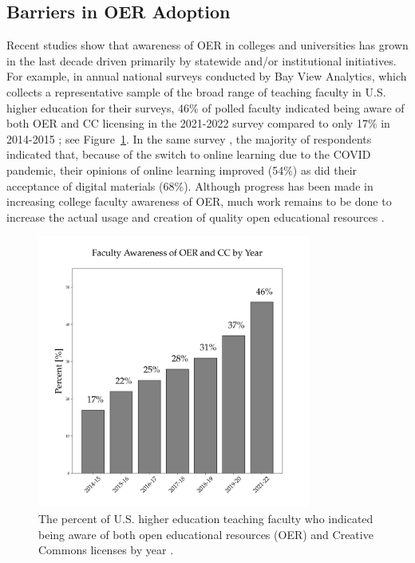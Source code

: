 \documentclass[11pt]{article}
\begin{document}
\subsection{Barriers in OER Adoption}
Recent studies show that awareness of OER in colleges and universities has grown in the last decade driven primarily by statewide and/or institutional initiatives.  For example, in annual national surveys conducted by Bay View Analytics, which collects a representative sample of the broad range of teaching faculty in U.S. higher education for their surveys, 46\% of polled faculty indicated being aware of both OER and CC licensing in the 2021-2022 survey compared to only 17\% in 2014-2015 \cite{JS-JS:2022}; see Figure~\ref{fig:oer-awareness}.  In the same survey \cite{JS-JS:2022}, the majority of respondents indicated that, because of the switch to online learning due to the COVID pandemic, their opinions of online learning improved (54\%) as did their acceptance of digital materials (68\%).  Although progress has been made in increasing college faculty awareness of OER, much work remains to be done to increase the actual usage and creation of quality open educational resources \cite{MB:2022, flvc2022}.
\begin{figure}[t]
\centering
\includegraphics[width=90mm]{oer_awareness.png}
\caption{The percent of U.S. higher education teaching faculty who indicated being aware of both open educational resources (OER) and Creative Commons licenses by year \cite{JS-JS:2022}.}
\label{fig:oer-awareness}
\end{figure}
\end{document}
